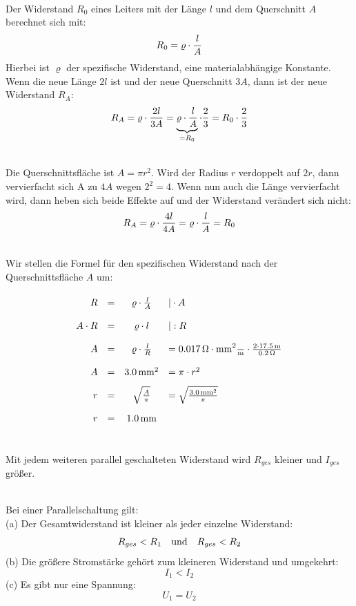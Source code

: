 \documentclass[a4paper]{article}
\begin{document}
\\
Der Widerstand $R_0$ eines Leiters mit der Länge $l$ und dem Querschnitt $A$ berechnet sich mit:
$$R_0= \varrho \cdot {l \over A}$$
Hierbei ist $\varrho$ der spezifische Widerstand, eine materialabhängige Konstante. Wenn die neue Länge $2l$ ist und der neue Querschnitt $3A$, dann ist der neue Widerstand $R_A:$
$$R_A= \varrho \cdot { 2 l \over 3 A} = \underbrace{\varrho \cdot { l\over A}}_{=R_0} \cdot {2 \over 3}=R_0 \cdot {2 \over 3}$$ 
\vspace{0.5 cm}

\\
Die Querschnittsfläche ist  $A=\pi r^2$. Wird der Radius $r$ verdoppelt auf $2r$, dann vervierfacht sich A zu $4A$ wegen $2^2=4$. Wenn nun auch die Länge vervierfacht wird, dann heben sich beide Effekte auf und der Widerstand verändert sich nicht:    
$$R_A= \varrho \cdot { 4l \over 4 A} =\varrho \cdot { l\over A}=R_0$$ 
\vspace{0.5 cm}

\\
Wir stellen die Formel für den spezifischen Widerstand nach der Querschnittsfläche $A$ um:
$$
\renewcommand{\arraystretch}{2}
\begin{array}{rccl}
R &=& \varrho \cdot {l \over A} &| \cdot A \\
A \cdot R &=& \varrho \cdot l   &| : R \\
A &=& \varrho \cdot {l \over R} & =\SI{0,017}{\ohm\cdot\milli\meter^2\over \meter}\cdot {2\cdot \SI{17,5}{\meter}\over \SI{0,2}{\ohm}}\\
A &=& \SI{3,0}{\milli\meter^2} & = \pi \cdot r^2 \\
r &=& \sqrt{A \over \pi} &= \sqrt{\SI{3,0}{\milli\meter^2}\over \pi}\\
r &=& \SI{1,0}{\milli\meter}
\end{array}
$$
\vspace{0.5 cm}

\\
Mit jedem weiteren parallel geschalteten Widerstand wird $R_{ges}$ kleiner und $I_{ges}$ größer.
\vspace{0.5 cm}

 \\
Bei einer Parallelschaltung gilt:\\
(a) Der Gesamtwiderstand ist kleiner als jeder einzelne Widerstand:
 $$R_{ges}<R_1 \quad {\rm und} \quad R_{ges}<R_2$$
(b) Die größere Stromstärke gehört zum kleineren Widerstand und umgekehrt: 
$$I_1<I_2$$
(c) Es gibt nur eine Spannung: 
$$U_1=U_2$$
\vspace{0.5 cm}
\end{document}
